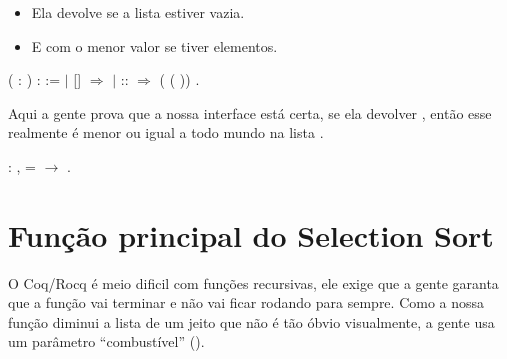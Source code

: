 \begin{itemize}
\item  Ela devolve  se a lista estiver vazia.

\item  E   com o menor valor se tiver elementos.

\end{itemize}
\begin{coqdoccode}
\coqdocemptyline
\coqdocnoindent
{}  ( :  ) :   :=\coqdoceol
\coqdocindent{1.00em}
  \coqdoceol
\coqdocindent{1.00em}
\ensuremath{|} [] \ensuremath{\Rightarrow} \coqdoceol
\coqdocindent{1.00em}
\ensuremath{|}  ::  \ensuremath{\Rightarrow}  ( (  ))\coqdoceol
\coqdocindent{1.00em}
.\coqdoceol
\coqdocemptyline
\end{coqdoccode}
Aqui a gente prova que a nossa interface está certa, se ela devolver  , então esse  realmente é menor ou igual a todo mundo na lista . 
\begin{coqdoccode}
\coqdocemptyline
\coqdocnoindent
{}  :\coqdoceol
\coqdocindent{1.00em}
\coqdockw{\ensuremath{\forall}}  ,\coqdoceol
\coqdocindent{2.00em}
  =   \ensuremath{\rightarrow}\coqdoceol
\coqdocindent{2.00em}
  .\coqdoceol
\coqdocemptyline
\end{coqdoccode}
\section{Função principal do Selection Sort}




    O Coq/Rocq é meio dificil com funções recursivas, ele exige que a gente garanta que a função vai terminar e não vai ficar rodando para sempre.
    Como a nossa função  diminui a lista de um jeito que não é tão óbvio visualmente, a gente usa um parâmetro ``combustível'' ().


